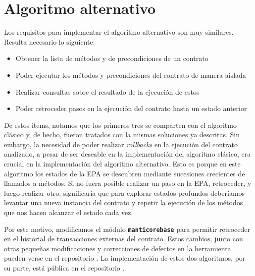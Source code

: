 \section{Algoritmo alternativo}
Los requisitos para implementar el algoritmo alternativo son muy similares.
Resulta necesario lo siguiente:
\begin{itemize}
    \item Obtener la lista de métodos y de precondiciones de un contrato
    \item Poder ejecutar los métodos y precondiciones del contrato de manera aislada
    \item Realizar consultas sobre el resultado de la ejecución de estos
    \item Poder retroceder pasos en la ejecución del contrato hasta un estado anterior
\end{itemize}
De estos items, notamos que los primeros tres se comparten con el algoritmo clásico y, de hecho, fueron tratados con la mismas soluciones ya descritas.
Sin embargo, la necesidad de poder realizar \textit{rollbacks} en la ejecución del contrato analizado, a pesar de ser deseable en la implementación del algoritmo clásico, era crucial en la implementación del algoritmo alternativo.
Esto es porque en este algoritmo los estados de la EPA se descubren mediante sucesiones crecientes de llamados a métodos.
Si no fuera posible realizar un paso en la EPA, retroceder, y luego realizar otro, significaría que para explorar estados profundos deberíamos levantar una nueva instancia del contrato y repetir la ejecución de los métodos que nos hacen alcanzar el estado cada vez.

Por este motivo, modificamos el módulo \textbf{\texttt{manticorebase}} para permitir retroceder en el historial de transacciones externas del contrato.
Estos cambios, junto con otras pequeñas modificaciones y correcciones de defectos en la herramienta pueden verse en el repositorio \cite{manticore-tiny-changes}.
La implementación de estos dos algoritmos, por su parte, está pública en el repositorio \cite{manticore-predicate-abstraction}.

